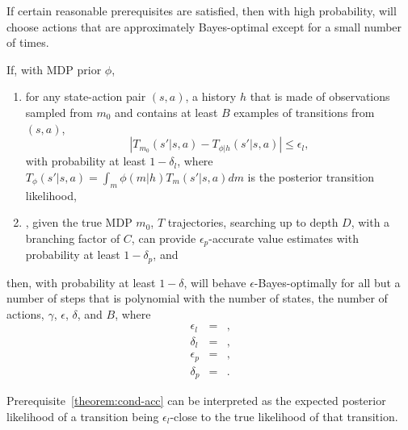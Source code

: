 If certain reasonable prerequisites are satisfied, then with high probability,  will choose actions that are approximately Bayes-optimal except for a small number of times.
\begin{thm}
If, with MDP prior $\phi$,
\begin{enumerate}
\item
\label{theorem:cond-acc} 
for any state-action pair $(s,a)$, a history $h$ that is made of observations sampled from $m_0$ and contains at least $B$ examples of transitions from $(s, a)$,
$$\left|T_{m_0}(s'|s,a) - T_{\phi|h}(s'|s,a)\right| \leq \epsilon_l,$$
with probability at least $1-\delta_l$,
where $T_{\phi}(s'|s,a) =\int_m \phi(m|h) T_m(s'|s,a) dm$ is the posterior transition likelihood,
\item
\label{theorem:cond-fsss}
, given the true MDP $m_0$, $T$ trajectories, searching up to depth $D$, with a branching factor of $C$, can provide $\epsilon_p$-accurate value estimates with probability at least $1-\delta_p$, and 
\end{enumerate}
then, with probability at least $1-\delta$,  will behave $\epsilon$-Bayes-optimally for all but a number of steps that is polynomial with the number of states, the number of actions, $\gamma$, $\epsilon$, $\delta$, and $B$, where
\begin{eqnarray}
\epsilon_l &=&,\\
\delta_l &=&,\\
\epsilon_p &=&,\\
\delta_p &=&.
\end{eqnarray}
\end{thm}

Prerequisite~\ref{theorem:cond-acc} can be interpreted as the expected posterior likelihood of a transition being $\epsilon_l$-close to the true likelihood of that transition.

